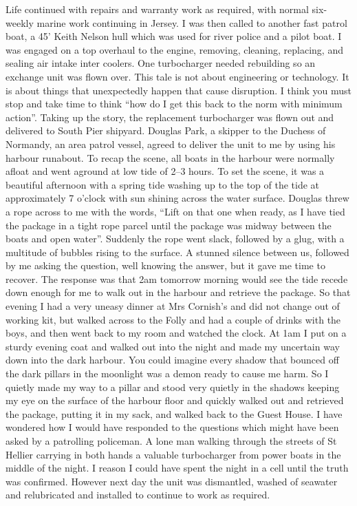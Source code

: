 Life continued with repairs and warranty work as required, with normal
six-weekly marine work continuing in Jersey. I was then called to another fast
patrol boat, a 45' Keith Nelson hull which was used for river police and a
pilot boat. I was engaged on a top overhaul to the engine, removing, cleaning,
replacing, and sealing air intake inter coolers. One turbocharger needed
rebuilding so an exchange unit was flown over. This tale is not about
engineering or technology. It is about things that unexpectedly happen that
cause disruption. I think you must stop and take time to think ``how do I get
this back to the norm with minimum action''. Taking up the story, the
replacement turbocharger was flown out and delivered to South Pier shipyard.
Douglas Park, a skipper to the Duchess of Normandy, an area patrol vessel,
agreed to deliver the unit to me by using his harbour runabout. To recap the
scene, all boats in the harbour were normally afloat and went aground at low
tide of 2--3 hours. To set the scene, it was a beautiful afternoon with a
spring tide washing up to the top of the tide at approximately 7 o'clock with
sun shining across the water surface. Douglas threw a rope across to me with
the words, ``Lift on that one when ready, as I have tied the package in a tight
rope parcel until the package was midway between the boats and open water''.
Suddenly the rope went slack, followed by a glug, with a multitude of bubbles
rising to the surface. A stunned silence between us, followed by me asking the
question, well knowing the answer, but it gave me time to recover. The response
was that 2am tomorrow morning would see the tide recede down enough for me to
walk out in the harbour and retrieve the package. So that evening I had a very
uneasy dinner at Mrs Cornish's and did not change out of working kit, but walked
across to the Folly and had a couple of drinks with the boys, and then went back
to my room and watched the clock. At 1am I put on a sturdy evening coat and
walked out into the night and made my uncertain way down into the dark harbour.
You could imagine every shadow that bounced off the dark pillars in the
moonlight was a demon ready to cause me harm. So I quietly made my way to a
pillar and stood very quietly in the shadows keeping my eye on the surface of
the harbour floor and quickly walked out and retrieved the package, putting it
in my sack, and walked back to the Guest House. I have wondered how I would have
responded to the questions which might have been asked by a patrolling
policeman. A lone man walking through the streets of St Hellier carrying in
both hands a valuable turbocharger from power boats in the middle of the night.
I reason I could have spent the night in a cell until the truth was confirmed.
However next day the unit was dismantled, washed of seawater and relubricated
and installed to continue to work as required.

